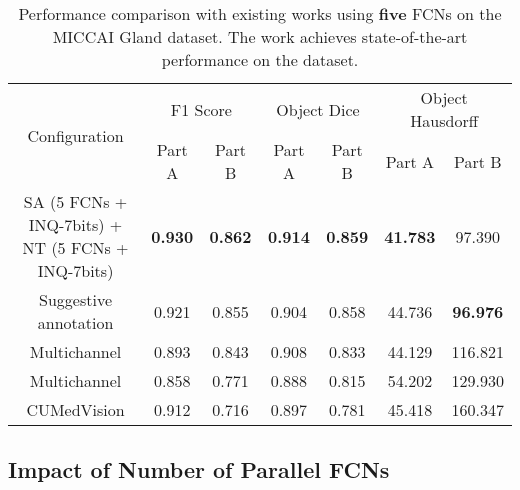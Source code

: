 \documentclass[10pt,twocolumn,letterpaper]{article}
\begin{document}

\begin{table*}[!htbp]
\centering
\caption{Performance comparison with existing works using \textbf{five} FCNs on the MICCAI Gland dataset. The work \cite{yang2017suggestive} achieves state-of-the-art performance on the dataset.}
\label{my-label}
\begin{tabular}{ccccccc}
\hline
\multirow{2}{*}{Configuration} & \multicolumn{2}{c}{F1 Score} & \multicolumn{2}{c}{Object Dice} & \multicolumn{2}{c}{Object Hausdorff} \\ \cline{2-7}
                                           & Part A  & Part B  & Part A   & Part B    & Part A    & Part B   \\ \hline
SA (5 FCNs + INQ-7bits) + NT (5 FCNs + INQ-7bits)
                 &   \textbf{0.930}	&\textbf{0.862}&	\textbf{0.914}	&\textbf{0.859}     & \textbf{41.783}     & 97.390        \\
Suggestive annotation \cite{yang2017suggestive}    &  0.921&	0.855&	0.904&	0.858     & 44.736     & \textbf{96.976}                  \\
Multichannel \cite{xu2017gland}   &  0.893&	0.843&	0.908	&0.833    & 44.129       & 116.821            \\
Multichannel \cite{xu2016gland}   &  0.858&	0.771&	0.888	&0.815    & 54.202       & 129.930            \\
CUMedVision  \cite{chen2016dcan}   &  0.912&	0.716&	0.897	&0.781    & 45.418       & 160.347            \\  \hline
\end{tabular}
\label{tab:inq-f5}
\end{table*}
\subsection{Impact of Number of Parallel FCNs}
\end{document}
